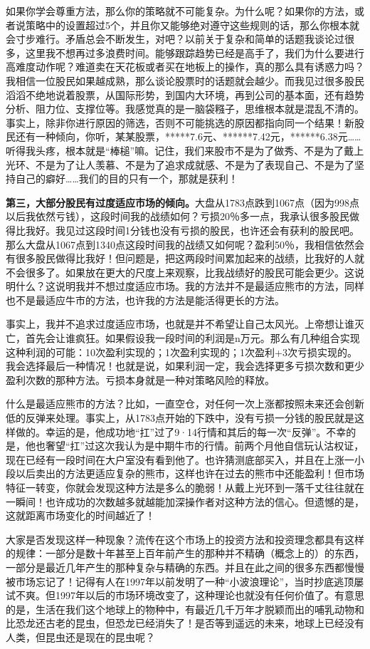 如果你学会尊重方法，那么你的策略就不可能复杂。为什么呢？如果你的方法，或者说策略中的设置超过5个，并且你又能够绝对遵守这些规则的话，那么你根本就会寸步难行。矛盾总会不断发生，对吧？以前关于复杂和简单的话题我谈论过很多，这里我不想再过多浪费时间。能够跟踪趋势已经是高手了，我们为什么要进行高难度动作呢？难道卖在天花板或者买在地板上的操作，真的那么具有诱惑力吗？我相信一位股民如果越成熟，那么谈论股票时的话题就会越少。而我见过很多股民滔滔不绝地说着股票，从国际形势，到国内大环境，再到公司的基本面，还有趋势分析、阻力位、支撑位等。我感觉真的是一脑袋糨子，思维根本就是混乱不清的。事实上，除非你进行原因的筛选，否则不可能挑选的原因都指向同一个结果！新股民还有一种倾向，你听，某某股票，*****7.6元、******7.42元，******6.38元……听得我头疼，根本就是“棒槌”嘛。记住，我们来股市不是为了做秀、不是为了戴上光环、不是为了让人羡慕、不是为了追求成就感、不是为了表现自己、不是为了坚持自己的癖好……我们的目的只有一个，那就是获利！

\textbf{第三，大部分股民有过度适应市场的倾向。}大盘从1783点跌到1067点（因为998点以后我依然亏钱），这段时间我的战绩如何？亏损20％多一点，我承认很多股民做得比我好。我见过这段时间1分钱也没有亏损的股民，也许还会有获利的股民吧。那么大盘从1067点到1340点这段时间我的战绩又如何呢？盈利50％，我相信依然会有很多股民做得比我好！但问题是，把这两段时间累加起来的战绩，比我好的人就不会很多了。如果放在更大的尺度上来观察，比我战绩好的股民可能会更少。这说明什么？这说明我并不想过度适应市场。我的方法并不是最适应熊市的方法，同样也不是最适应牛市的方法，也许我的方法是能活得更长的方法。

事实上，我并不追求过度适应市场，也就是并不希望让自己太风光。上帝想让谁灭亡，首先会让谁疯狂。如果假设我一段时间的利润是n万元。那么有几种组合实现这种利润的可能：10次盈利实现的；1次盈利实现的；1次盈利+3次亏损实现的。我会选择最后一种情况！也就是说，如果利润一定，我会选择更多亏损次数和更少盈利次数的那种方法。亏损本身就是一种对策略风险的释放。

什么是最适应熊市的方法？比如，一直空仓，对任何一次上涨都按照未来还会创新低的反弹来处理。事实上，从1783点开始的下跌中，没有亏损一分钱的股民就是这样做的。幸运的是，他成功地“扛”过了9·14行情和其后的每一次“反弹”。不幸的是，他也奢望“扛”过这次我认为是中期牛市的行情。前两个月他自信玩认沽权证，现在已经有一段时间在大户室没有看到他了。也许猜测底部买入，并且在上涨一小段以后卖出的方法更适应复杂的熊市，这样也许在过去的熊市中还能盈利！但市场特征一转变，你就会发现这种方法是多么的脆弱！从戴上光环到一落千丈往往就在一瞬间！也许成功的次数越多就越能加深操作者对这种方法的信心。但遗憾的是，这就距离市场变化的时间越近了！

大家是否发现这样一种现象？流传在这个市场上的投资方法和投资理念都具有这样的规律：一部分是数十年甚至上百年前产生的那种并不精确（概念上的）的东西，一部分是最近几年产生的那种复杂与精确的东西。并且在此之间的很多东西都慢慢被市场忘记了！记得有人在1997年以前发明了一种“小波浪理论”，当时抄底逃顶屡试不爽。但1997年以后的市场环境改变了，这种理论也就没有任何价值了。有意思的是，生活在我们这个地球上的物种中，有最近几千万年才脱颖而出的哺乳动物和比恐龙还古老的昆虫，但恐龙已经消失了！是否等到遥远的未来，地球上已经没有人类，但昆虫还是现在的昆虫呢？

